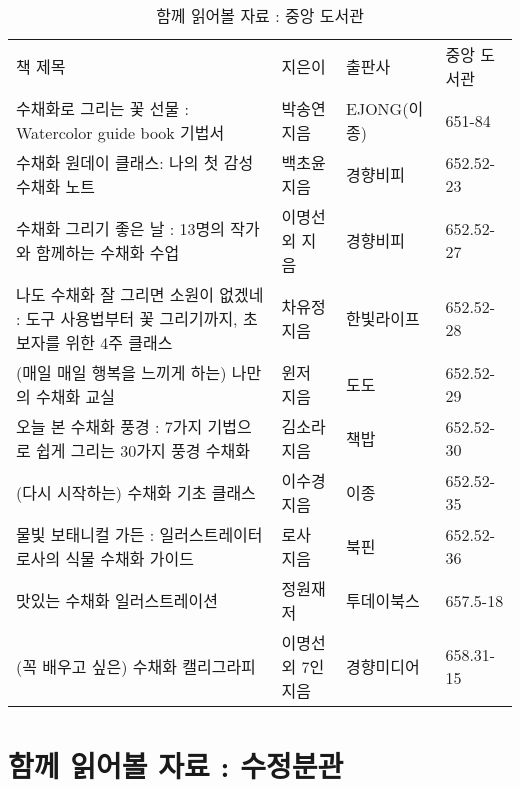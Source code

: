 \documentclass[12pt, a4paper, oneside]{book}
\let\stdsection\section
\renewcommand\section{\newpage\stdsection}
\begin{document}
		\begin{table}[hbp]
		\caption{ 함께 읽어볼 자료 : 중앙 도서관 }
		\centering 

		\tabulinesep=4pt

		\begin{tabu} to \linewidth{ X[r,4] X[r,1] X[r,1] X[r,1]   }
			\toprule
			책 제목	&지은이	&출판사	&중앙 도서관\\
			\tabucline[1pt]{-}
수채화로 그리는 꽃 선물 : Watercolor guide book 기법서			&박송연 지음	&EJONG(이종)	&651-84 		\\
수채화 원데이 클래스: 나의 첫 감성 수채화 노트 				&백초윤 지음	&경향비피		&652.52-23	\\
수채화 그리기 좋은 날	: 13명의 작가와 함께하는 수채화 수업	&이명선 외 지음	&경향비피		&652.52-27 \\
나도 수채화 잘 그리면 소원이 없겠네 : 도구 사용법부터 꽃 그리기까지, 초보자를 위한 4주 클래스 	
														&차유정 지음	&한빛라이프	&652.52-28 \\
(매일 매일 행복을 느끼게 하는) 나만의 수채화 교실				&윈저 지음	&도도	&652.52-29 \\
오늘 본 수채화 풍경 : 7가지 기법으로 쉽게 그리는 30가지 풍경 수채화 
														&김소라 지음	&책밥	&652.52-30 \\
(다시 시작하는) 수채화 기초 클래스	&이수경 지음	&이종	&652.52-35 	\\
물빛 보태니컬 가든 : 일러스트레이터 로사의 식물 수채화 가이드	&로사 지음	&북핀	&652.52-36	\\
맛있는 수채화 일러스트레이션								&정원재 저	&투데이북스	&657.5-18	\\
(꼭 배우고 싶은) 수채화 캘리그라피							&이명선 외 7인 지음	&경향미디어	&658.31-15\\
			\bottomrule
		\end{tabu}

		\end{table}


%
	\section{ 함께 읽어볼 자료 : 수정분관 } 


\end{document}

